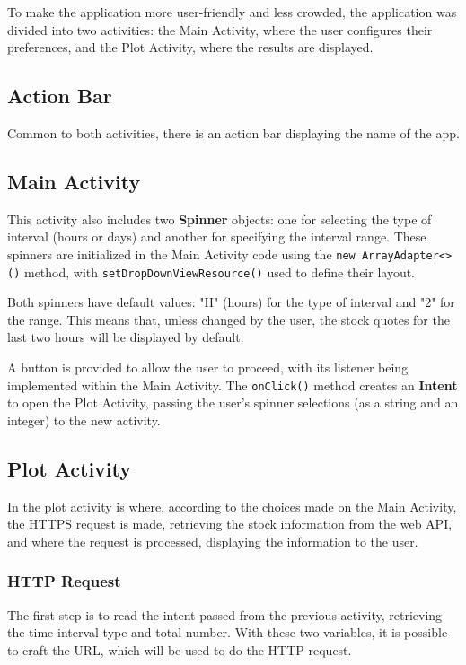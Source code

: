 \documentclass{article}
\begin{document}
To make the application more user-friendly and less crowded, the application was divided into two activities: the Main Activity, where the user configures their preferences, and the Plot Activity, where the results are displayed.

\subsection{Action Bar}
Common to both activities, there is an action bar displaying the name of the app. 

\subsection{Main Activity}
\label{sec:Main Activity Java}

This activity also includes two \textbf{Spinner} objects: one for selecting the type of interval (hours or days) and another for specifying the interval range. 
These spinners are initialized in the Main Activity code using the \texttt{new ArrayAdapter<>()} method, with \texttt{setDropDownViewResource()} used to define their layout.

Both spinners have default values: "H" (hours) for the type of interval and "2" for the range. 
This means that, unless changed by the user, the stock quotes for the last two hours will be displayed by default.

A button is provided to allow the user to proceed, with its listener being implemented within the Main Activity. The \texttt{onClick()} method creates an \textbf{Intent} to open the Plot Activity, passing the user's spinner selections (as a string and an integer) to the new activity.



\subsection{Plot Activity}
In the plot activity is where, according to the choices made on the Main Activity, the HTTPS request is made, retrieving the stock information from the web API, and where the request is processed, displaying the information to the user.

\subsubsection{HTTP Request}
The first step is to read the intent passed from the previous activity, retrieving the time interval type and total number.
With these two variables, it is possible to craft the URL, which will be used to do the HTTP request.
\end{document}
